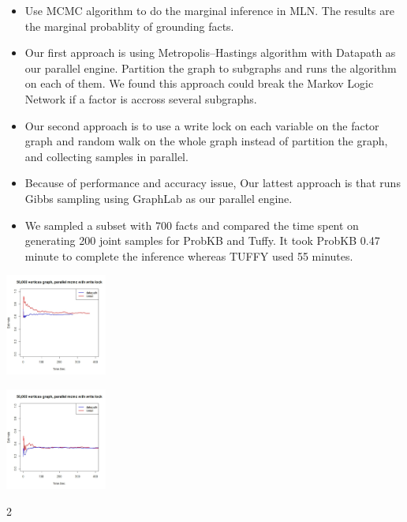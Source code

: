 \documentclass[landscape,final,a0paper,fontscale=0.285]{baposter}
\begin{document}
\begin{poster}
{\begin{itemize}
\end{itemize}
}

 {
  \newcommand{\compactlist}{\setlength{\itemsep}{0pt} \setlength{\parskip}{0pt} \setlength{\leftskip}{-1em}}
   
 \begin{multicols}{2}

\begin{itemize}\compactlist
     \item Use MCMC algorithm to do the marginal inference in MLN. The results are the marginal probablity of grounding facts.

     \item Our first approach is using Metropolis–Hastings algorithm with Datapath as our parallel engine. Partition the graph to subgraphs and runs the algorithm on each of them. We found this approach could break the Markov Logic Network if a factor is accross several subgraphs.  

     \item Our second approach is to use a write lock on each variable on the factor graph and random walk on the whole graph instead of partition the graph, and collecting samples in parallel.  
    
     \item Because of performance and accuracy issue, Our lattest approach is that runs Gibbs sampling using GraphLab as our parallel engine.
     \item We sampled a subset with 700 facts and compared the time spent on generating 200 joint samples for ProbKB and Tuffy. It took ProbKB 0.47 minute to complete the inference whereas TUFFY used 55 minutes.

     
   \end{itemize}

 \begin{multicols}{2}
\begin{center}
 \includegraphics[height=9em]{images/R1.jpeg}  
  \end{center} 
\begin{center}
 \includegraphics[height=9em]{images/R3.jpeg}  
  \end{center} 
 \end{multicols}{2}



\end{multicols}}
\end{poster}
\end{document}
